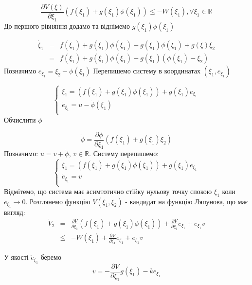 \documentclass{article}
\begin{document}
\begin{equation}
    \frac{\partial V(\xi)}{\partial \xi_1}(f(\xi_1)+g(\xi_1)\phi(\xi_1)) \leq
    -W(\xi_1), \forall \xi_1 \in \mathbb{R}
\end{equation}
До першого рівняння додамо та віднімемо $g(\xi_1)\phi(\xi_1)$

\begin{eqnarray}
\dot\xi_1 &=& f(\xi_1)+g(\xi_1)\phi(\xi_1)-g(\xi_1)\phi(\xi_1)+g(\xi)\xi_2\\
&=&f(\xi_1)+g(\xi_1)\phi(\xi_1)-g(\xi_1)(\phi(\xi_1)-\xi_2)
\end{eqnarray}
Позначимо $e_{\xi_1} = \xi_2-\phi(\xi_1)$
Перепишемо систему в координатах $(\xi_1, e_{\xi_1})$

\begin{equation}
    \begin{cases}
    \dot \xi_1 = (f(\xi_1)+g(\xi_1)\phi(\xi_1))+g(\xi_1)e_{\xi_1}\\
    \dot e_{\xi_1} = u-\dot \phi(\xi_1)\\  
    \end{cases}
\end{equation}
Обчислити $\dot\phi$ 

\begin{equation}
    \dot\phi = \frac{\partial \phi}{\partial \xi_1}(f(\xi_1)+g(\xi_1)\xi_2)
\end{equation}
Позначимо: $u = v + \dot\phi$, $v \in \mathbb{R}$.
Систему перепишемо:
\begin{equation}
    \begin{cases}
        \dot \xi_1 = (f(\xi_1)+g(\xi_1)\phi(\xi_1))+g(\xi_1)e_{\xi_1}\\
        \dot e_{\xi_1} = v\\
    \end{cases}
\end{equation}
Відмітемо, що система має асимтотично стійку нульову точку спокою $\xi_1$ коли $e_{\xi_1} \rightarrow 0$.
Розглянемо функцію $V(\xi_1,\xi_2)$ - кандидат на функцію Ляпунова, що має вигляд:
\begin{eqnarray}
    \dot V_2 &=& \frac{\partial V}{\partial \xi_1}(f(\xi_1)+g(\xi_1)\phi(\xi_1))+
    \frac{\partial V}{\partial \xi_1}e_{\xi_1}+e_{\xi_1}v\\
    &\leq& -W(\xi_1)+ \frac{\partial V}{\partial \xi_1}e_{\xi_1}+e_{\xi_1}v
\end{eqnarray}

У якості $\dot e_{\xi_1}$ беремо 
\begin{equation}
    v = - \frac{\partial V}{\partial \xi_1}g(\xi_1) - ke_{\xi_1}
\end{equation}
\end{document}
